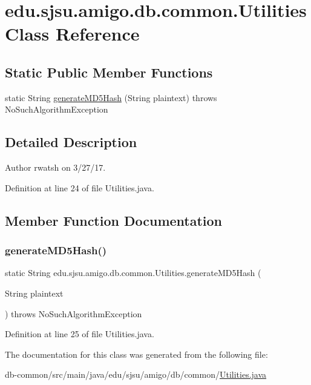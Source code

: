 \hypertarget{classedu_1_1sjsu_1_1amigo_1_1db_1_1common_1_1_utilities}{}\section{edu.\+sjsu.\+amigo.\+db.\+common.\+Utilities Class Reference}
\label{classedu_1_1sjsu_1_1amigo_1_1db_1_1common_1_1_utilities}
\subsection*{Static Public Member Functions}
\begin{DoxyCompactItemize}
\item 
static String \hyperlink{classedu_1_1sjsu_1_1amigo_1_1db_1_1common_1_1_utilities_adf0e65888d4b40df9152ed43f6d2949f}{generate\+M\+D5\+Hash} (String plaintext)  throws No\+Such\+Algorithm\+Exception 
\end{DoxyCompactItemize}


\subsection{Detailed Description}
\begin{DoxyAuthor}{Author}
rwatsh on 3/27/17. 
\end{DoxyAuthor}


Definition at line 24 of file Utilities.\+java.



\subsection{Member Function Documentation}
\mbox{\label{classedu_1_1sjsu_1_1amigo_1_1db_1_1common_1_1_utilities_adf0e65888d4b40df9152ed43f6d2949f}} 
\subsubsection{\texorpdfstring{generate\+M\+D5\+Hash()}{generateMD5Hash()}}
{\footnotesize\ttfamily static String edu.\+sjsu.\+amigo.\+db.\+common.\+Utilities.\+generate\+M\+D5\+Hash (\begin{DoxyParamCaption}\item[{String}]{plaintext }\end{DoxyParamCaption}) throws No\+Such\+Algorithm\+Exception\hspace{0.3cm}{\ttfamily [static]}}



Definition at line 25 of file Utilities.\+java.



The documentation for this class was generated from the following file\+:\begin{DoxyCompactItemize}
\item 
db-\/common/src/main/java/edu/sjsu/amigo/db/common/\hyperlink{_utilities_8java}{Utilities.\+java}\end{DoxyCompactItemize}
